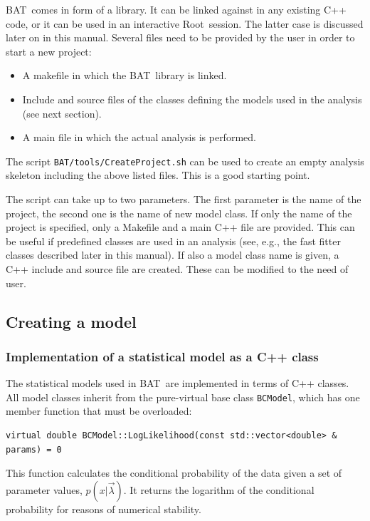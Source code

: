 \documentclass[11pt, a4paper]{article}
\newcommand{\bat}{{\sc BAT}}
\newcommand{\Root}{{\sc Root}}
\begin{document}
\bat\ comes in form of a library. It can be linked against in any
existing C++ code, or it can be used in an interactive
\Root\ session. The latter case is discussed later on in this
manual. Several files need to be provided by the user in order to
start a new project:
%
\begin{itemize}
\item A makefile in which the \bat\ library is linked.
\item Include and source files of the classes defining the models
used in the analysis (see next section).
\item A main file in which the actual analysis is performed.
\end{itemize}
%
The script \verb|BAT/tools/CreateProject.sh| can be used to create an
empty analysis skeleton including the above listed files. This is a
good starting point.

The script can take up to two parameters. The first parameter is the
name of the project, the second one is the name of new model class. If
only the name of the project is specified, only a Makefile and a main
C++ file are provided. This can be useful if predefined classes are
used in an analysis (see, e.g., the fast fitter classes described
later in this manual). If also a model class name is given, a C++
include and source file are created. These can be modified to the need
of user.


\subsection{Creating a model}
\label{subsection:model}


\subsubsection{Implementation of a statistical model as a C++ class}
\label{subsubsection:implementation}

The statistical models used in \bat\ are implemented in terms of C++
classes. All model classes inherit from the pure-virtual base class
\verb|BCModel|, which has one member function that must be overloaded:
%
\begin{verbatim}
virtual double BCModel::LogLikelihood(const std::vector<double> & params) = 0
\end{verbatim}
%
This function calculates the conditional probability of the data given
a set of parameter values, $p(x|\vec{\lambda})$. It returns the
logarithm of the conditional probability for reasons of numerical
stability.
%
\end{document}
